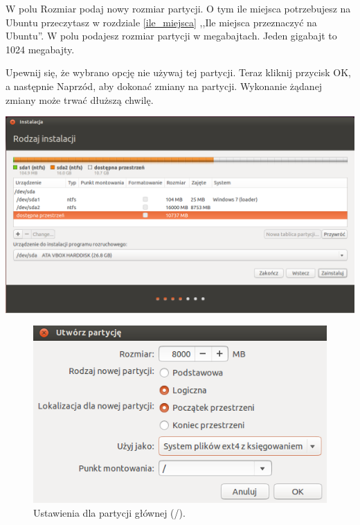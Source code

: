 W polu \textcolor{ubuntu_orange}{Rozmiar} podaj nowy rozmiar partycji. O tym ile miejsca potrzebujesz na Ubuntu przeczytasz w rozdziale \ref{ile_miejsca} ,,Ile miejsca przeznaczyć na Ubuntu''. W polu podajesz rozmiar partycji w megabajtach. Jeden gigabajt to 1024 megabajty.

Upewnij się, że wybrano opcję \textcolor{ubuntu_orange}{nie używaj tej partycji}. Teraz kliknij przycisk \textcolor{ubuntu_orange}{OK}, a następnie \textcolor{ubuntu_orange}{Naprzód}, aby dokonać zmiany na partycji. Wykonanie żądanej zmiany może trwać dłuższą chwilę.

\begin{center}
	\includegraphics[width=\linewidth]{images/instalator_partycjonowanie_gparted3.png}
\end{center}

\begin{figure}
	\vspace{-10pt}
	\includegraphics[width=\linewidth]{images/instalator_partycjonowanie_gparted_dodaj_root.png}
	\caption*{Ustawienia dla partycji głównej (/).}
\end{figure}

